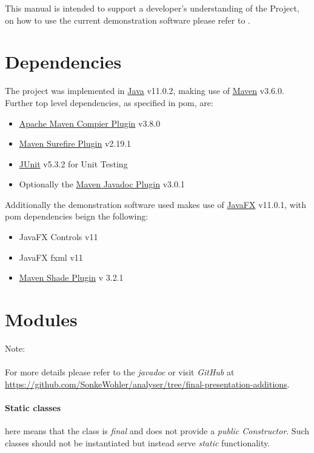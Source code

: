 \documentclass[main.tex]{subfiles}
\begin{document}
  
  This manual is intended to support a developer's understanding of the Project, on how to use the current demonstration software please refer to .
  
  \section{Dependencies}
  
    The project was implemented in \href{https://openjdk.java.net/projects/jdk/11/}{Java} v11.0.2, making use of \href{http://maven.apache.org/}{Maven} v3.6.0. Further top level dependencies, as specified in pom, are:
    \begin{itemize}
      \item \href{https://maven.apache.org/plugins/maven-compiler-plugin/index.html}{Apache Maven Compier Plugin} v3.8.0
      \item \href{https://maven.apache.org/surefire/maven-surefire-plugin/}{Maven Surefire Plugin} v2.19.1
      \item \href{https://junit.org/junit5/}{JUnit} v5.3.2 for Unit Testing
      \item Optionally the \href{https://maven.apache.org/plugins/maven-javadoc-plugin/}{Maven Javadoc Plugin} v3.0.1
    \end{itemize}
    Additionally the demonstration software used makes use of \href{https://openjfx.io/}{JavaFX} v11.0.1, with pom dependencies beign the following:
    \begin{itemize}
      \item JavaFX Controls v11
      \item JavaFX fxml v11
      \item \href{https://maven.apache.org/plugins/maven-shade-plugin/}{Maven Shade Plugin} v 3.2.1
    \end{itemize}
  
  \section{Modules}
    
    Note:
    \\\\
    For more details please refer to the \textit{javadoc} or visit \textit{GitHub} at \url{https://github.com/SonkeWohler/analyser/tree/final-presentation-additions}.
    
    \paragraph{Static classes} here means that the class is \textit{final} and does not provide a \textit{public Constructor}. Such classes should not be instantiated but instead serve \textit{static} functionality.
    
\end{document}
